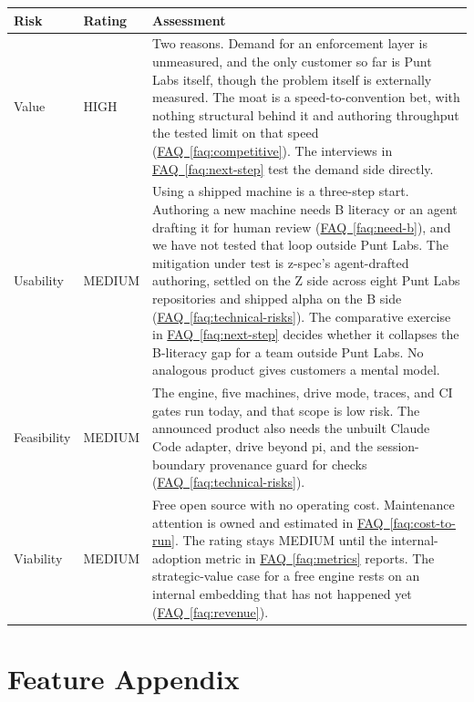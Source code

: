 \documentclass[11pt,letterpaper]{article}
\newcommand{\faqref}[1]{\hyperref[#1]{FAQ~\ref*{#1}}}
\begin{document}
\renewcommand{\arraystretch}{1.6}
\begin{tabularx}{\textwidth}{@{} l l X @{}}
\toprule
\textbf{\color{SectionBlue}Risk} & \textbf{\color{SectionBlue}Rating} & \textbf{\color{SectionBlue}Assessment} \\
\midrule
Value      & \textcolor{RiskRed}{HIGH} & Two reasons. Demand for an enforcement layer is unmeasured, and the only customer so far is Punt Labs itself, though the problem itself is externally measured. The moat is a speed-to-convention bet, with nothing structural behind it and authoring throughput the tested limit on that speed (\faqref{faq:competitive}). The interviews in \faqref{faq:next-step} test the demand side directly. \\
Usability  & \textcolor{RiskAmber}{MEDIUM} & Using a shipped machine is a three-step start. Authoring a new machine needs B literacy or an agent drafting it for human review (\faqref{faq:need-b}), and we have not tested that loop outside Punt Labs. The mitigation under test is z-spec's agent-drafted authoring, settled on the Z side across eight Punt Labs repositories and shipped alpha on the B side (\faqref{faq:technical-risks}). The comparative exercise in \faqref{faq:next-step} decides whether it collapses the B-literacy gap for a team outside Punt Labs. No analogous product gives customers a mental model. \\
Feasibility & \textcolor{RiskAmber}{MEDIUM} & The engine, five machines, drive mode, traces, and CI gates run today, and that scope is low risk. The announced product also needs the unbuilt Claude Code adapter, drive beyond pi, and the session-boundary provenance guard for checks (\faqref{faq:technical-risks}). \\
Viability  & \textcolor{RiskAmber}{MEDIUM} & Free open source with no operating cost. Maintenance attention is owned and estimated in \faqref{faq:cost-to-run}. The rating stays MEDIUM until the internal-adoption metric in \faqref{faq:metrics} reports. The strategic-value case for a free engine rests on an internal embedding that has not happened yet (\faqref{faq:revenue}). \\
\bottomrule
\end{tabularx}
\renewcommand{\arraystretch}{1.0}


\newpage
\section*{Feature Appendix}
\end{document}

